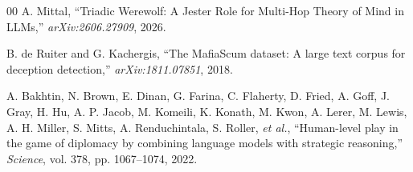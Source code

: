 \documentclass[10pt,conference]{IEEEtran}
\begin{document}
\begin{thebibliography}{00}
 A. Mittal, ``Triadic Werewolf: A Jester Role for Multi-Hop Theory of Mind in LLMs,'' \textit{arXiv:2606.27909}, 2026.

 B. de Ruiter and G. Kachergis, ``The MafiaScum dataset: A large text corpus for deception detection,'' \textit{arXiv:1811.07851}, 2018.

 A. Bakhtin, N. Brown, E. Dinan, G. Farina, C. Flaherty, D. Fried, A. Goff, J. Gray, H. Hu, A. P. Jacob, M. Komeili, K. Konath, M. Kwon, A. Lerer, M. Lewis, A. H. Miller, S. Mitts, A. Renduchintala, S. Roller, \textit{et al.}, ``Human-level play in the game of diplomacy by combining language models with strategic reasoning,'' \textit{Science}, vol. 378, pp. 1067--1074, 2022.

\end{thebibliography}
\end{document}
